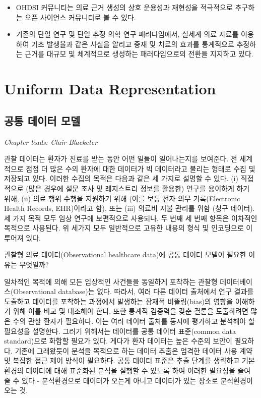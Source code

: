 \documentclass[11pt]{book}
\theoremstyle{definition}
\theoremstyle{definition}
\theoremstyle{definition}
\theoremstyle{remark}
\let\BeginKnitrBlock\begin \let\EndKnitrBlock\end
\begin{document}
\BeginKnitrBlock{rmdsummary}
\begin{itemize}
\item
  OHDSI 커뮤니티는 의료 근거 생성의 상호 운용성과 재현성을 적극적으로
  추구하는 오픈 사이언스 커뮤니티로 볼 수 있다.
\item
  기존의 단일 연구 및 단일 추정 의학 연구 패러다임에서, 실세계 의료
  자료를 이용하여 기초 발생율과 같은 사실을 알리고 중재 및 치료의 효과를
  통계적으로 추정하는 근거를 대규모 및 체계적으로 생성하는
  패러다임으로의 전환을 지지하고 있다.
\end{itemize}
\EndKnitrBlock{rmdsummary}

\part{Uniform Data
Representation}\label{part-uniform-data-representation}

\chapter{공통 데이터 모델}\label{CommonDataModel}

\emph{Chapter leads: Clair Blacketer}

관찰 데이터는 환자가 진료를 받는 동안 어떤 일들이 일어나는지를 보여준다.
전 세계적으로 점점 더 많은 수의 환자에 대한 데이터가 빅 데이터라고
불리는 형태로 수집 및 저장되고 있다. 이러한 수집의 목적은 다음과 같은 세
가지로 설명할 수 있다. (i) 직접적으로 (많은 경우에 설문 조사 및
레지스트리 정보를 활용한) 연구를 용이하게 하기 위해, (ii) 의료 행위
수행을 지원하기 위해 (이를 보통 전자 의무 기록(Electronic Health
Records, EHR)이라고 함), 또는 (iii) 의료비 지불 관리를 위함 (청구
데이터). 세 가지 목적 모두 임상 연구에 보편적으로 사용되나, 두 번째 세
번째 항목은 이차적인 목적으로 사용된다. 위 세가지 모두 일반적으로 고유한
내용의 형식 및 인코딩으로 이루어져 있다. 

관찰형 의료 데이터(Observational healthcare data)에 공통 데이터 모델이
필요한 이유는 무엇일까?

일차적인 목적에 의해 모든 임상적인 사건들을 동일하게 포착하는 관찰형
데이터베이스(Observational database)는 없다. 따라서, 여러 다른 데이터
출처에서 연구 결과를 도출하고 데이터를 포착하는 과정에서 발생하는 잠재적
비뚤림(bias)의 영향을 이해하기 위해 이를 비교 및 대조해야 한다. 또한
통계적 검증력을 갖춘 결론을 도출하려면 많은 수의 관찰 환자가 필요하다.
이는 여러 데이터 출처를 동시에 평가하고 분석해야 할 필요성을 설명한다.
그러기 위해서는 데이터를 공통 데이터 표준(common data standard)으로
화합할 필요가 있다. 게다가 환자 데이터는 높은 수준의 보안이 필요하다.
기존에 그래왔듯이 분석을 목적으로 하는 데이터 추출은 엄격한 데이터 사용
계약 및 복잡한 접근 제어 방식이 필요하다. 공통 데이터 표준은 추출 단계를
생략하고 기본 환경의 데이터에 대해 표준화된 분석을 실행할 수 있도록 하여
이러한 필요성을 줄여 줄 수 있다 - 분석환경으로 데이터가 오는게 아니고
데이터가 있는 장소로 분석환경이 오는 것.
\end{document}
